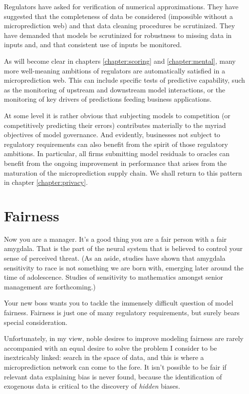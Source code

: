 Regulators have asked for verification of numerical approximations. They have suggested that the completeness of data be considered (impossible without a microprediction web) and that data cleaning procedures be scrutinized. They have demanded that models be scrutinized for robustness to missing data in inputs and, and that consistent use of inputs be monitored. 


As will become clear in chapters \ref{chapter:scoring} and \ref{chapter:mental}, many more well-meaning ambitions of regulators are automatically satisfied in a microprediction web. This can include specific tests of predictive capability, such as the monitoring of upstream and downstream model interactions, or the monitoring of key drivers of predictions feeding business applications.


At some level it is rather obvious that subjecting models to competition (or competitively predicting their errors) contributes materially to the myriad objectives of model governance. And evidently, businesses not subject to regulatory requirements can also benefit from the spirit of those regulatory ambitions. In particular, all firms submitting model residuals to oracles can benefit from the ongoing improvement in performance that arises from the maturation of the microprediction supply chain. We shall return to this pattern in chapter \ref{chapter:privacy}. 

\section{Fairness}
\label{sec:fairness}

Now you are a manager. It's a good thing you are a fair person with a fair amygdala. That is the part of the neural system that is believed to control your sense of perceived threat. (As an aside, studies have shown that amygdala sensitivity to race is not something we are born with, emerging later around the time of adolescence. Studies of sensitivity to mathematics amongst senior management are forthcoming.) 

Your new boss wants you to tackle the immensely difficult question of model fairness. Fairness is just one of many regulatory requirements, but surely bears special consideration. 

Unfortunately, in my view, noble desires to improve modeling fairness are rarely accompanied with an equal desire to solve the problem I consider to be inextricably linked: search in the space of data, and this is where a microprediction network can come to the fore. It isn't possible to be fair if relevant data explaining bias is never found, because the identification of exogenous data is critical to the discovery of {\em hidden} biases. 


